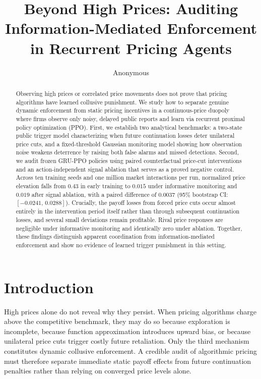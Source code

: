 \documentclass{article}
\title{Beyond High Prices: Auditing Information-Mediated Enforcement in Recurrent Pricing Agents}
\author{Anonymous}
\begin{document}
\maketitle

\begin{abstract}
Observing high prices or correlated price movements does not prove that pricing algorithms have learned collusive punishment. We study how to separate genuine dynamic enforcement from static pricing incentives in a continuous-price duopoly where firms observe only noisy, delayed public reports and learn via recurrent proximal policy optimization (PPO). First, we establish two analytical benchmarks: a two-state public trigger model characterizing when future continuation losses deter unilateral price cuts, and a fixed-threshold Gaussian monitoring model showing how observation noise weakens deterrence by raising both false alarms and missed detections. Second, we audit frozen GRU-PPO policies using paired counterfactual price-cut interventions and an action-independent signal ablation that serves as a proved negative control. Across ten training seeds and one million market interactions per run, normalized price elevation falls from $0.43$ in early training to $0.015$ under informative monitoring and $0.019$ after signal ablation, with a paired difference of $0.0037$ (95\% bootstrap CI: $[-0.0241,\,0.0288]$). Crucially, the payoff losses from forced price cuts occur almost entirely in the intervention period itself rather than through subsequent continuation losses, and several small deviations remain profitable. Rival price responses are negligible under informative monitoring and identically zero under ablation. Together, these findings distinguish apparent coordination from information-mediated enforcement and show no evidence of learned trigger punishment in this setting.
\end{abstract}

\section{Introduction}

High prices alone do not reveal why they persist. When pricing algorithms charge above the competitive benchmark, they may do so because exploration is incomplete, because function approximation introduces upward bias, or because unilateral price cuts trigger costly future retaliation. Only the third mechanism constitutes dynamic collusive enforcement. A credible audit of algorithmic pricing must therefore separate immediate static payoff effects from future continuation penalties rather than relying on converged price levels alone.
\end{document}
